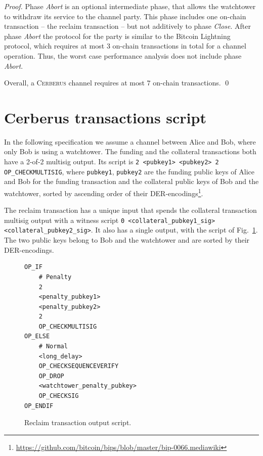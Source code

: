 \documentclass[runningheads]{llncs}
\newcommand{\sys}{\textsc{Cerberus}\xspace}
\begin{document}
\begin{proof}
Phase \textit{Abort} is an optional intermediate phase, that allows the watchtower to withdraw its service to the channel party. This phase includes one on-chain transaction -- the reclaim transaction -- but not additively to phase \textit{Close}. After phase \textit{Abort} the protocol for the party is similar to the Bitcoin Lightning protocol, which  requires at most $3$ on-chain transactions in total for a channel operation. Thus, the worst case performance analysis does not include phase \textit{Abort}.

Overall, a \sys channel requires at most $7$ on-chain transactions.
\hfill \qed
\end{proof}


\section{Cerberus transactions script}
\label{sec:script}

In the following specification we assume a channel between Alice and Bob, where only Bob is using a watchtower.
The funding and the collateral transactions both have a 2-of-2 multisig output. Its script is
\texttt{2 <pubkey1> <pubkey2> 2 OP\_CHECKMULTISIG},
where \texttt{pubkey1}, \texttt{pubkey2} are the funding public keys of Alice and Bob for the funding transaction and the collateral public keys of Bob and the watchtower, sorted by ascending order of their DER-encodings\footnote{\url{https://github.com/bitcoin/bips/blob/master/bip-0066.mediawiki}}.

The reclaim transaction has a unique input that spends the collateral transaction multisig output with a witness script
\texttt{0 <collateral\_pubkey1\_sig> <collateral\_pubkey2\_sig>}.
It also has a single output, with the script of Fig.~\ref{script:claim}. The two public keys belong to Bob and the watchtower and are sorted by their DER-encodings.

\begin{figure}[ht!]
    \begin{verbatim}
OP_IF
    # Penalty
    2
    <penalty_pubkey1>
    <penalty_pubkey2>
    2
    OP_CHECKMULTISIG
OP_ELSE
    # Normal
    <long_delay>
    OP_CHECKSEQUENCEVERIFY
    OP_DROP
    <watchtower_penalty_pubkey>
    OP_CHECKSIG
OP_ENDIF
    \end{verbatim}
\caption{Reclaim transaction output script.}
\label{script:claim}
\end{figure}
\end{document}
